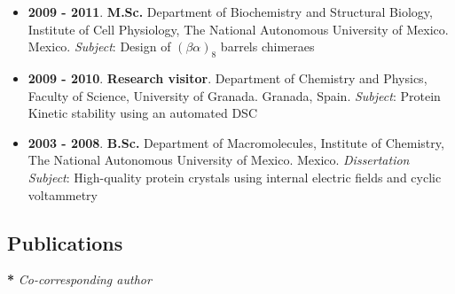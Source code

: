 \documentclass[letterpaper,11pt]{article}
\begin{document}
\begin{itemize}
\item \textbf{2009 - 2011}. \textbf{M.Sc.}  Department of Biochemistry and Structural Biology, Institute of Cell Physiology, The National Autonomous University of Mexico. Mexico.   %
  \textit{Subject}: Design of $(\beta\alpha)_8$ barrels chimeraes
  
\item \textbf{2009 - 2010}. \textbf{Research visitor}. Department of Chemistry and Physics, Faculty of Science, University of Granada. Granada, Spain.   %
  \textit{Subject}: Protein Kinetic stability using an automated DSC
  
\item \textbf{2003 - 2008}. \textbf{B.Sc.} Department of Macromolecules, Institute of Chemistry, The National Autonomous University of Mexico. Mexico.  %
  \textit{Dissertation Subject}: High-quality protein crystals using internal electric fields and cyclic voltammetry

\end{itemize}
\subsection*{Publications}
\vspace*{0.2cm}
\textbf{*} \textit{Co-corresponding author} \\ %
\end{document}
